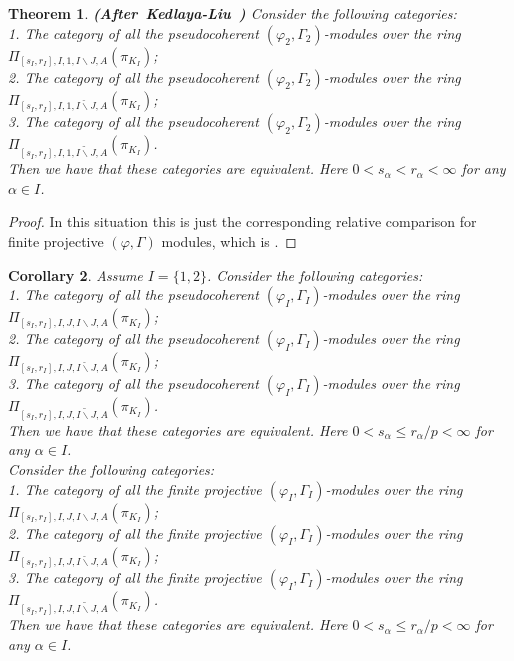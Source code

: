 \documentclass[12pt]{amsart}
\newtheorem{theorem}{Theorem}[section]
\newtheorem{corollary}[theorem]{Corollary}
\theoremstyle{definition}
\numberwithin{equation}{section}
\begin{document}
\begin{theorem} \mbox{\bf{(After Kedlaya-Liu \cite[Theorem 5.7.5]{KL2})}}
Consider the following categories:\\
1. The category of all the pseudocoherent $(\varphi_2,\Gamma_2)$-modules over the ring $\Pi_{[s_I,r_{I}],I,{1},I\backslash J,A}(\pi_{K_I})$;\\
2. The category of all the pseudocoherent $(\varphi_2,\Gamma_2)$-modules over the ring $\Pi_{[s_I,r_{I}],I,{1},\breve{I\backslash J},A}(\pi_{K_I})$;\\
3. The category of all the pseudocoherent $(\varphi_2,\Gamma_2)$-modules over the ring $\Pi_{[s_I,r_{I}],I,{1},\widetilde{I\backslash J},A}(\pi_{K_I})$.\\
Then we have that these categories are equivalent. Here $0< s_\alpha<r_\alpha<\infty$ for any $\alpha\in I$.
\end{theorem}



\begin{proof}
In this situation this is just the corresponding relative comparison for finite projective $(\varphi,\Gamma)$ modules, which is \cite[Proposition 5.44, Proposition 5.51]{T2}.	
\end{proof}




\begin{corollary}
Assume $I=\{1,2\}$. Consider the following categories:\\
1. The category of all the pseudocoherent $(\varphi_I,\Gamma_I)$-modules over the ring $\Pi_{[s_I,r_{I}],I,J,I\backslash J,A}(\pi_{K_I})$;\\
2. The category of all the pseudocoherent $(\varphi_I,\Gamma_I)$-modules over the ring $\Pi_{[s_I,r_{I}],I,J,\breve{I\backslash J},A}(\pi_{K_I})$;\\
3. The category of all the pseudocoherent $(\varphi_I,\Gamma_I)$-modules over the ring $\Pi_{[s_I,r_{I}],I,J,\widetilde{I\backslash J},A}(\pi_{K_I})$.\\
Then we have that these categories are equivalent. Here $0< s_\alpha\leq r_\alpha/p<\infty$ for any $\alpha\in I$. \\
Consider the following categories:\\
1. The category of all the finite projective $(\varphi_I,\Gamma_I)$-modules over the ring $\Pi_{[s_I,r_{I}],I,J,I\backslash J,A}(\pi_{K_I})$;\\
2. The category of all the finite projective $(\varphi_I,\Gamma_I)$-modules over the ring $\Pi_{[s_I,r_{I}],I,J,\breve{I\backslash J},A}(\pi_{K_I})$;\\
3. The category of all the finite projective $(\varphi_I,\Gamma_I)$-modules over the ring $\Pi_{[s_I,r_{I}],I,J,\widetilde{I\backslash J},A}(\pi_{K_I})$.\\
Then we have that these categories are equivalent. Here $0< s_\alpha\leq r_\alpha/p<\infty$ for any $\alpha\in I$.	
\end{corollary}
\end{document}
